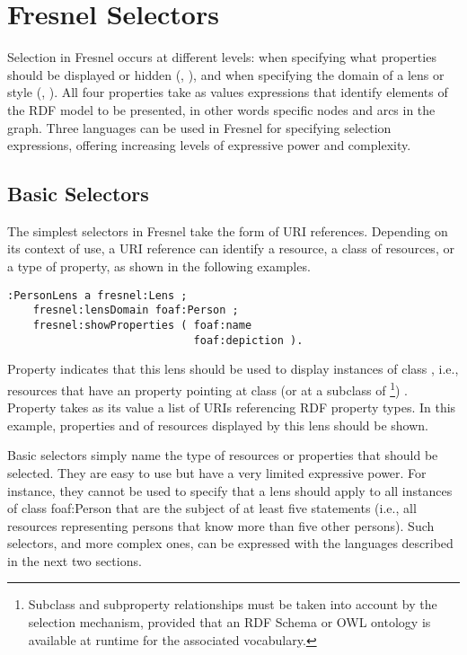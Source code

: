 \section{Fresnel Selectors}
\label{selectors}

Selection in Fresnel occurs at different levels: when specifying what properties should be displayed or hidden (, ), and when specifying the domain of a lens or style (, ). All four properties take as values expressions that identify elements of the RDF model to be presented, in other words specific nodes and arcs in the graph. Three languages can be used in Fresnel for specifying selection expressions, offering increasing levels of expressive power and complexity. 

\subsection{Basic Selectors}

The simplest selectors in Fresnel take the form of URI references. Depending on its context of use, a URI reference can identify a resource, a class of resources, or a type of property, as shown in the following examples.
\begin{small}
\begin{verbatim}:PersonLens a fresnel:Lens ;
    fresnel:lensDomain foaf:Person ;
    fresnel:showProperties ( foaf:name
                             foaf:depiction ).
\end{verbatim}
\end{small}
Property  indicates that this lens should be used to display instances of class , i.e., resources that have an  property pointing at class (or at a subclass of \footnote{Subclass and subproperty relationships must be taken into account by the selection mechanism, provided that an RDF Schema or OWL ontology is available at runtime for the associated vocabulary.}) . Property  takes as its value a list of URIs referencing RDF property types. In this example, properties  and  of resources displayed by this lens should be shown.

Basic selectors simply name the type of resources or properties that should be selected. They are easy to use but have a very limited expressive power. For instance, they cannot be used to specify that a lens should apply to all instances of class foaf:Person that are the subject of at least five  statements (i.e., all resources representing persons that know more than five other persons). Such selectors, and more complex ones, can be expressed with the languages described in the next two sections.

